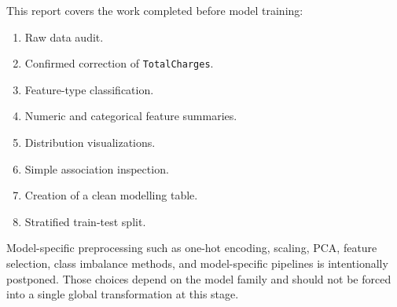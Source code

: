 This report covers the work completed before model training:

\begin{enumerate}[leftmargin=*]
    \item Raw data audit.
    \item Confirmed correction of \texttt{TotalCharges}.
    \item Feature-type classification.
    \item Numeric and categorical feature summaries.
    \item Distribution visualizations.
    \item Simple association inspection.
    \item Creation of a clean modelling table.
    \item Stratified train-test split.
\end{enumerate}

Model-specific preprocessing such as one-hot encoding, scaling, PCA, feature selection, class imbalance methods, and model-specific pipelines is intentionally postponed. Those choices depend on the model family and should not be forced into a single global transformation at this stage.